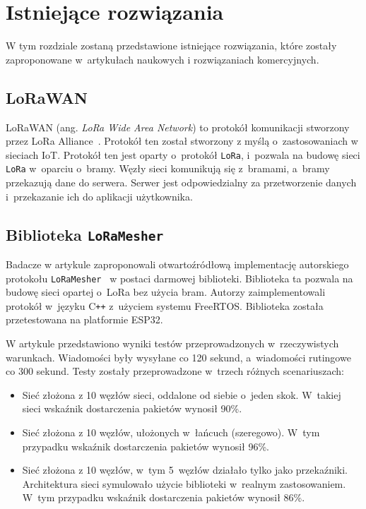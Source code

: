 \chapter{Istniejące rozwiązania}
W tym rozdziale zostaną przedstawione istniejące rozwiązania, które zostały zaproponowane w~artykułach naukowych i rozwiązaniach komercyjnych.
\section{LoRaWAN}

LoRaWAN (ang. \emph{LoRa Wide Area Network}) to protokół komunikacji stworzony przez LoRa Alliance~\cite{lora:about}.
Protokół ten został stworzony z myślą o~zastosowaniach w sieciach IoT.
Protokół ten jest oparty o~protokół \texttt{LoRa}, i~pozwala na budowę sieci \texttt{LoRa} w~oparciu o~bramy.
Węzły sieci komunikują się z~bramami, a~bramy przekazują dane do serwera.
Serwer jest odpowiedzialny za przetworzenie danych i~przekazanie ich do aplikacji użytkownika.




\section{Biblioteka \texttt{LoRaMesher}} \label{sec:loramesher}
Badacze w artykule zaproponowali otwartoźródłową implementację autorskiego protokołu \texttt{LoRaMesher}~\cite{bib:loramesher} w postaci darmowej biblioteki.
Biblioteka ta pozwala na budowę sieci opartej o~LoRa bez użycia bram.
Autorzy zaimplementowali protokół w~języku C\texttt{++} z~użyciem systemu FreeRTOS.
Biblioteka została przetestowana na platformie ESP32.

W artykule przedstawiono wyniki testów przeprowadzonych w~rzeczywistych warunkach.
Wiadomości były wysyłane co 120 sekund, a~wiadomości rutingowe co 300 sekund.
Testy zostały przeprowadzone w~trzech różnych scenariuszach:

\begin{itemize}
    \item Sieć złożona z 10 węzłów sieci, oddalone od siebie o~jeden skok. W~takiej sieci wskaźnik dostarczenia pakietów wynosił 90\%.
    \item Sieć złożona z 10 węzłów, ułożonych w~łańcuch (szeregowo). W~tym przypadku wskaźnik dostarczenia pakietów wynosił 96\%.
    \item Sieć złożona z 10 węzłów, w~tym 5~węzłów działało tylko jako przekaźniki. Architektura sieci symulowało użycie biblioteki w~realnym zastosowaniem. W~tym przypadku wskaźnik dostarczenia pakietów wynosił 86\%.
\end{itemize}

